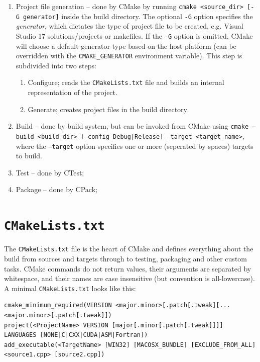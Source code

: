 \documentclass[table, xcdraw]{article}%
\begin{document}
\begin{enumerate}
    \item Project file generation -- done by CMake by running \texttt{cmake <source_dir> [-G generator]} inside the build directory. The optional \texttt{-G} option specifies the \emph{generator}, which dictates the type of project file to be created, e.g. Visual Studio 17 solutions/projects or makefiles. If the \texttt{-G} option is omitted, CMake will choose a default generator type based on the host platform (can be overridden with the \texttt{CMAKE_GENERATOR} environment variable). This step is subdivided into two steps:
    \begin{enumerate}
        \item Configure; reads the \texttt{CMakeLists.txt} file and builds an internal representation of the project.
        \item Generate; creates project files in the build directory
    \end{enumerate}
    \item Build -- done by build system, but can be invoked from CMake using \texttt{cmake --build <build_dir> [--config Debug|Release] --target <target_name>}, where the \texttt{--target} option specifies one or more (seperated by spaces) targets to build.
    \item Test -- done by CTest;
    \item Package -- done by CPack;
\end{enumerate}

\section{\texttt{CMakeLists.txt}}

The \texttt{CMakeLists.txt} file is the heart of CMake and defines everything about the build from sources and targets through to testing, packaging and other custom tasks. CMake commands do not return values, their arguments are separated by whitespace, and their names are case insensitive (but convention is all-lowercase). A minimal \texttt{CMakeLists.txt} looks like this:

\begin{verbatim}
cmake_minimum_required(VERSION <major.minor>[.patch[.tweak][...<major.minor>[.patch[.tweak]])
project(<ProjectName> VERSION [major[.minor[.patch[.tweak]]]] LANGUAGES [NONE|C|CXX|CUDA|ASM|Fortran])
add_executable(<TargetName> [WIN32] [MACOSX_BUNDLE] [EXCLUDE_FROM_ALL] <source1.cpp> [source2.cpp])
\end{verbatim}
\end{document}
